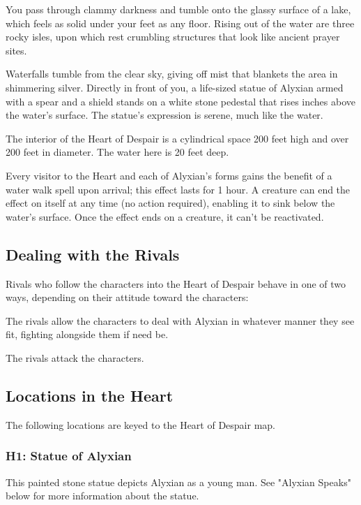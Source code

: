 \documentclass[10pt,a4paper,twoside,bg=print,twocolumn,openany,nodeprecatedcode]{dndbook}
\begin{document}
\begin{DndReadAloud}{}
You pass through clammy darkness and tumble onto the glassy surface of a lake, which feels as solid under your feet as any floor. Rising out of the water are three rocky isles, upon which rest crumbling structures that look like ancient prayer sites.

Waterfalls tumble from the clear sky, giving off mist that blankets the area in shimmering silver. Directly in front of you, a life-sized statue of Alyxian armed with a spear and a shield stands on a white stone pedestal that rises inches above the water's surface. The statue's expression is serene, much like the water.

\end{DndReadAloud}

The interior of the Heart of Despair is a cylindrical space 200 feet high and over 200 feet in diameter. The water here is 20 feet deep.

Every visitor to the Heart and each of Alyxian's forms gains the benefit of a water walk spell upon arrival; this effect lasts for 1 hour. A creature can end the effect on itself at any time (no action required), enabling it to sink below the water's surface. Once the effect ends on a creature, it can't be reactivated.

\subsection{Dealing with the Rivals}
Rivals who follow the characters into the Heart of Despair behave in one of two ways, depending on their attitude toward the characters:


\begin{description}[nolistsep]
\item[Friendly or Indifferent Rivals.]
The rivals allow the characters to deal with Alyxian in whatever manner they see fit, fighting alongside them if need be.
\item[Hostile Rivals.]
The rivals attack the characters.
\end{description}



\subsection{Locations in the Heart}
The following locations are keyed to the Heart of Despair map.

\subsubsection{H1: Statue of Alyxian}
This painted stone statue depicts Alyxian as a young man. See "Alyxian Speaks" below for more information about the statue.
\end{document}
